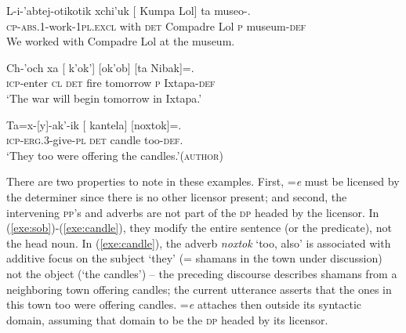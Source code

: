 \documentclass[output=paper,
modfonts
]{LSP/langsci}
\begin{document}
		\begin{exe}
		\ex\label{exe:sob}\bridgeoverex
		\gll L-i-'abtej-otikotik xchi'uk [ Kumpa Lol] ta museo-. \\
		\textsc{cp-abs.1}-work-\textsc{1pl.excl} with \textsc{det} Compadre Lol \textsc{p} museum-\textsc{def} \\
		\glt We worked with Compadre Lol at the museum. \citep[25]{laughlin1980} 
		\end{exe}
		\begin{exe}
		\ex\label{exe:vov}\bridgeoverex
		\gll Ch-'och xa [ k'ok'] [ok'ob] [ta Nibak]=\tikzmarkfullnamed{q}{\underline{e}}. \\
		\textsc{icp}-enter \textsc{cl} \textsc{det} fire tomorrow \textsc{p} Ixtapa-\textsc{def} \\
		\glt `The war will begin tomorrow in Ixtapa.'  \citep[119]{laughlin1977} 
		\bridgeover{p}{q}
		\end{exe}
		\begin{exe}
		\ex\label{exe:candle}\bridgeoverex
		\gll Ta=x-[y]-ak'-ik [ kantela] [noxtok]=\tikzmarkfullnamed{j}{\underline{e}}. \\
		\textsc{icp-erg.3}-give-\textsc{pl} \textsc{det} candle too-\textsc{def}. \\
		\glt `They too were offering the candles.'(\textsc{author})
		\bridgeover{i}{j}
		\end{exe}
There are two properties to note in these examples. First, =\emph{e} must be licensed by the determiner since there is no other licensor present; and second, the intervening \textsc{pp}'s and adverbs are not part of the \textsc{dp} headed by the licensor. In (\ref{exe:sob})-(\ref{exe:candle}), they modify the entire sentence (or the predicate), not the head noun. In (\ref{exe:candle}), the adverb \emph{noxtok} `too, also' is associated with additive focus on the subject `they' (= shamans in the town under discussion) not the object (`the candles')  --  the preceding discourse describes shamans from a neighboring town offering candles; the current utterance asserts that the ones in this town too were offering candles. 
  =\emph{e} attaches then outside its syntactic domain, assuming that domain to be the \textsc{dp} headed by its licensor. 
 
\end{document}
